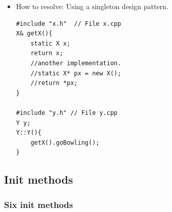 \documentclass[a4paper,11pt,twoside]{book}
\begin{document}
\begin{itemize}
	\item  How to resolve: Using a singleton design pattern.
	\begin{lstlisting}[numbers=none]
#include "x.h"  // File x.cpp
X& getX(){
	static X x;
	return x;
	//another implementation.
	//static X* px = new X();
	//return *px;
}
	
#include "y.h" // File y.cpp
Y y;
Y::Y(){
	getX().goBowling();
}
\end{lstlisting}
\end{itemize}


\subsection{Init methods}

\subsubsection{Six init methods}
\end{document}
